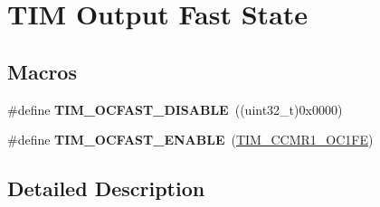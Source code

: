 \hypertarget{group___t_i_m___output___fast___state}{}\section{T\+IM Output Fast State}
\label{group___t_i_m___output___fast___state}
\subsection*{Macros}
\begin{DoxyCompactItemize}
\item 
\#define {\bfseries T\+I\+M\+\_\+\+O\+C\+F\+A\+S\+T\+\_\+\+D\+I\+S\+A\+B\+LE}~((uint32\+\_\+t)0x0000)\hypertarget{group___t_i_m___output___fast___state_ga71429b63f2a6604171ccfd3a91ccf43a}{}\label{group___t_i_m___output___fast___state_ga71429b63f2a6604171ccfd3a91ccf43a}

\item 
\#define {\bfseries T\+I\+M\+\_\+\+O\+C\+F\+A\+S\+T\+\_\+\+E\+N\+A\+B\+LE}~(\hyperlink{group___peripheral___registers___bits___definition_gab9c5878e85ce02c22d8a374deebd1b6e}{T\+I\+M\+\_\+\+C\+C\+M\+R1\+\_\+\+O\+C1\+FE})\hypertarget{group___t_i_m___output___fast___state_ga445a2c0633ac649e816cf7a16b716d61}{}\label{group___t_i_m___output___fast___state_ga445a2c0633ac649e816cf7a16b716d61}

\end{DoxyCompactItemize}


\subsection{Detailed Description}
